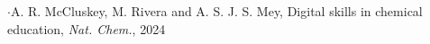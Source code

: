 \documentclass[preview]{standalone}
\begin{document}
\begin{center}
$\cdot$A. R. McCluskey, M. Rivera and A. S. J. S. Mey, Digital skills in chemical education, \textit{Nat. Chem.}, 2024
\end{center}
\end{document}
